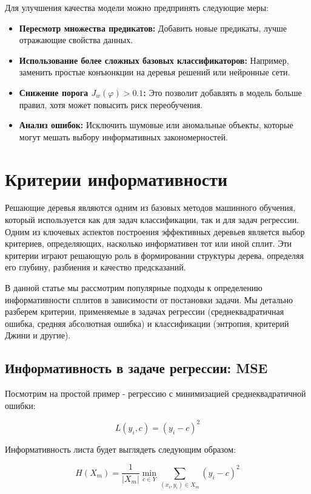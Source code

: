 \begin{itemize}
Для улучшения качества модели можно предпринять следующие меры:
\begin{itemize}
    \item \textbf{Пересмотр множества предикатов:} Добавить новые предикаты, лучше отражающие свойства данных.  
    \item \textbf{Использование более сложных базовых классификаторов:} Например, заменить простые конъюнкции на деревья решений или нейронные сети.  
    \item \textbf{Снижение порога \( J_w(\varphi) > 0.1 \):} Это позволит добавлять в модель больше правил, хотя может повысить риск переобучения.  
    \item \textbf{Анализ ошибок:} Исключить шумовые или аномальные объекты, которые могут мешать выбору информативных закономерностей.
\end{itemize}


\section*{Критерии информативности}

Решающие деревья являются одним из базовых методов машинного обучения, который используется как для задач классификации, так и для задач регрессии. Одним из ключевых аспектов построения эффективных деревьев является выбор критериев, определяющих, насколько информативен тот или иной сплит. Эти критерии играют решающую роль в формировании структуры дерева, определяя его глубину, разбиения и качество предсказаний. 

В данной статье мы рассмотрим популярные подходы к определению информативности сплитов в зависимости от постановки задачи. Мы детально разберем критерии, применяемые в задачах регрессии (среднеквадратичная ошибка, средняя абсолютная ошибка) и классификации (энтропия, критерий Джини и другие).


\subsection*{Информативность в задаче регрессии: MSE}
Посмотрим на простой пример - регрессию с минимизацией среднеквадратичной ошибки:

\[
L\left(y_{i}, c\right)=\left(y_{i}-c\right)^{2}
\]

Информативность листа будет выглядеть следующим образом:

\[
H\left(X_{m}\right)=\frac{1}{\left|X_{m}\right|} \min _{c \in Y} \sum_{\left(x_{i}, y_{i}\right) \in X_{m}}\left(y_{i}-c\right)^{2}
\]


\end{itemize}
